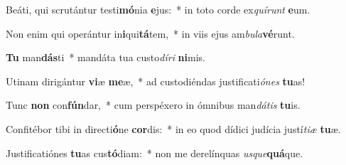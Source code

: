 \item Beáti, qui scrutántur testi\textbf{mó}nia \textbf{e}jus:~* in toto corde ex\textit{quí}\textit{runt} \textbf{e}um.
\item Non enim qui operántur in\textbf{i}qui\textbf{tá}tem,~* in viis ejus am\textit{bu}\textit{la}\textbf{vé}runt.
\item \textbf{Tu} man\textbf{dás}ti~* mandáta tua custo\textit{dí}\textit{ri} \textbf{ni}mis.
\item Utinam dirigántur \textbf{vi}æ \textbf{me}æ,~* ad custodiéndas justificati\textit{ó}\textit{nes} \textbf{tu}as!
\item Tunc \textbf{non} con\textbf{fún}dar,~* cum perspéxero in ómnibus man\textit{dá}\textit{tis} \textbf{tu}is.
\item Confitébor tibi in directi\textbf{ó}ne \textbf{cor}dis:~* in eo quod dídici judícia justí\textit{ti}\textit{æ} \textbf{tu}æ.
\item Justificatiónes \textbf{tu}as cus\textbf{tó}diam:~* non me derelínquas \textit{us}\textit{que}\textbf{quá}que.
